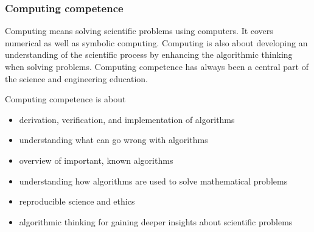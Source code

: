 \documentclass{beamer}
\begin{document}
\begin{frame}
\frametitle{Computing competence}

\begin{block}{}
Computing means solving scientific problems using computers. It covers
numerical as well as symbolic computing. Computing is also about
developing an understanding of the scientific process by enhancing the
algorithmic thinking when solving problems.  Computing competence has
always been a central part of the science and engineering
education. 

Computing competence is about

\begin{itemize}
\item derivation, verification, and implementation of algorithms

\item understanding what can go wrong with algorithms

\item overview of important, known algorithms

\item understanding how algorithms are used to solve mathematical problems

\item reproducible science and ethics

\item algorithmic thinking for gaining deeper insights about scientific problems
\end{itemize}

\noindent
\end{block}
\end{frame}
\end{document}
